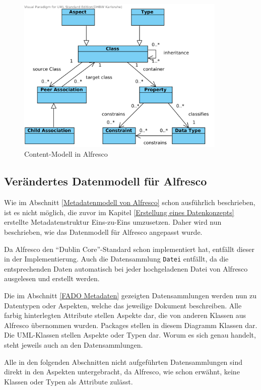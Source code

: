 \begin{figure}[!ht]
\centering
\includegraphics[width=10cm]{Bilder/Alfresco_Contentmodel.png}
\caption{Content-Modell in Alfresco}
\label{Alfresco Content-Modell}
\centering
\end{figure}

\subsection{Ver\"andertes Datenmodell f\"ur Alfresco}\label{Ver\"andertes Datenmodell f\"ur Alfresco}
Wie im Abschnitt \ref{Metadatenmodell von Alfresco} schon ausf\"uhrlich beschrieben, ist es nicht m\"oglich, die zuvor im Kapitel \ref{Erstellung eines Datenkonzepts} erstellte Metadatenstruktur Eins-zu-Eins umzusetzen. Daher wird nun beschrieben, wie das Datenmodell f\"ur Alfresco angepasst wurde.

Da Alfresco den "`Dublin Core"'-Standard schon implementiert hat, entf\"allt dieser in der Implementierung. Auch die Datensammlung \texttt{Datei} entf\"allt, da die entsprechenden Daten automatisch bei jeder hochgeladenen Datei von Alfresco ausgelesen und erstellt werden. 

Die im Abschnitt \ref{FADO Metadaten} gezeigten Datensammlungen werden nun zu Datentypen oder Aspekten, welche das jeweilige Dokument beschreiben. Alle farbig hinterlegten Attribute stellen Aspekte dar, die von anderen Klassen aus Alfresco \"ubernommen wurden.
Packages stellen in diesem Diagramm Klassen dar. Die UML-Klassen stellen Aspekte oder Typen dar. Worum es sich genau handelt, steht jeweils auch an den Datensammlungen. 

Alle in den folgenden Abschnitten nicht aufgef\"uhrten Datensammlungen sind direkt in den Aspekten untergebracht, da Alfresco, wie schon erw\"ahnt, keine Klassen oder Typen als Attribute zul\"asst.

